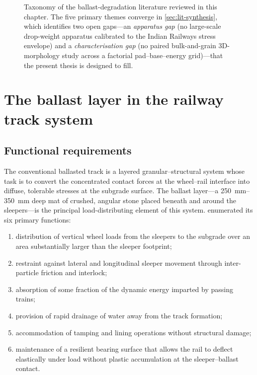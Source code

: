 \begin{figure}[ht]
\caption{Taxonomy of the ballast-degradation literature reviewed in
         this chapter. The five primary themes converge in
         \cref{sec:lit-synthesis}, which identifies two open gaps---an
         \emph{apparatus gap} (no large-scale drop-weight apparatus
         calibrated to the Indian Railways stress envelope) and a
         \emph{characterisation gap} (no paired bulk-and-grain
         3D-morphology study across a factorial pad--base--energy
         grid)---that the present thesis is designed to fill.}
\label{fig:lit-taxonomy}
\end{figure}

\section{The ballast layer in the railway track system}
\label{sec:lit-layer}

\subsection{Functional requirements}
\label{sec:lit-functional}

The conventional ballasted track is a layered granular--structural system
whose task is to convert the concentrated contact forces at the
wheel--rail interface into diffuse, tolerable stresses at the subgrade
surface. The ballast layer---a \SIrange{250}{350}{\milli\metre} deep mat
of crushed, angular stone placed beneath and around the sleepers---is the
principal load-distributing element of this system. \citet{Selig1994}
enumerated its six primary functions:
\begin{enumerate}[label=(\roman*),leftmargin=*,itemsep=2pt]
    \item distribution of vertical wheel loads from the sleepers to the
          subgrade over an area substantially larger than the sleeper
          footprint;
    \item restraint against lateral and longitudinal sleeper movement
          through inter-particle friction and interlock;
    \item absorption of some fraction of the dynamic energy imparted by
          passing trains;
    \item provision of rapid drainage of water away from the track
          formation;
    \item accommodation of tamping and lining operations without
          structural damage;
    \item maintenance of a resilient bearing surface that allows the rail
          to deflect elastically under load without plastic accumulation
          at the sleeper--ballast contact.
\end{enumerate}

